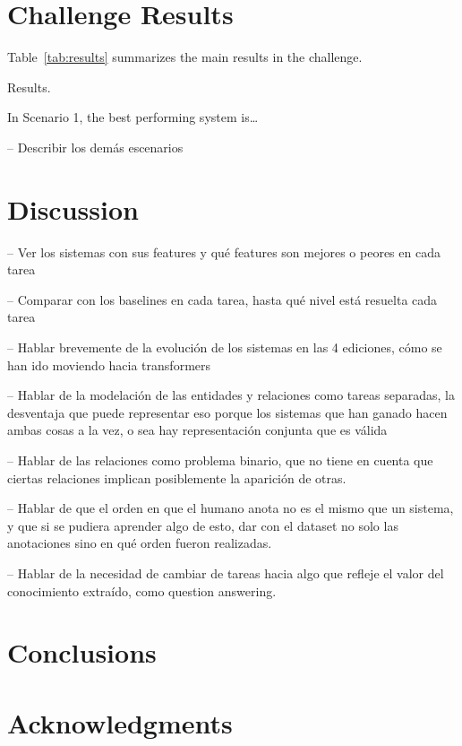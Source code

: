 \documentclass[a4paper,11pt,twocolumn,twoside]{article}
\begin{document}
\section{Challenge Results}

Table~\ref{tab:results} summarizes the main results in the challenge.

\begin{table}
  \caption{Results.\label{tab:results}}
\end{table}

In Scenario 1, the best performing system is\dots

-- Describir los demás escenarios

\section{Discussion}

-- Ver los sistemas con sus features y qué features son mejores o peores en cada tarea

-- Comparar con los baselines en cada tarea, hasta qué nivel está resuelta cada tarea

-- Hablar brevemente de la evolución de los sistemas en las 4 ediciones,
cómo se han ido moviendo hacia transformers

-- Hablar de la modelación de las entidades y relaciones como tareas separadas,
la desventaja que puede representar eso porque los sistemas que han ganado hacen
ambas cosas a la vez, o sea hay representación conjunta que es válida

-- Hablar de las relaciones como problema binario, que no tiene en cuenta que ciertas
relaciones implican posiblemente la aparición de otras.

-- Hablar de que el orden en que el humano anota no es el mismo que un sistema,
y que si se pudiera aprender algo de esto, dar con el dataset no solo las anotaciones
sino en qué orden fueron realizadas.

-- Hablar de la necesidad de cambiar de tareas hacia algo que refleje el valor
del conocimiento extraído, como question answering.

\section{Conclusions}

\section*{Acknowledgments}



\end{document}
